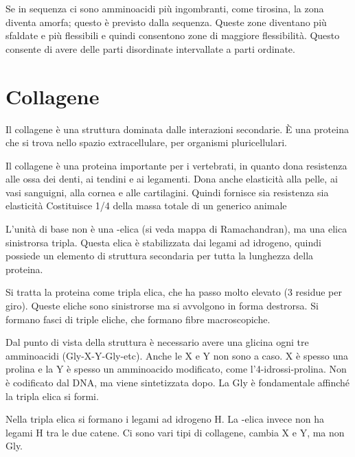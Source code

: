 
Se in sequenza ci sono amminoacidi più ingombranti, come tirosina, la
zona diventa amorfa; questo è previsto dalla sequenza. Queste zone diventano
più sfaldate e più flessibili e quindi consentono zone di maggiore
flessibilità. Questo consente di avere delle parti disordinate
intervallate a parti ordinate.

\clearpage

\section{Collagene}

Il collagene è una struttura dominata dalle interazioni secondarie. È una proteina che si
trova nello spazio extracellulare, per organismi pluricellulari.

Il collagene è una proteina importante per i vertebrati, in quanto dona resistenza alle ossa dei denti,
ai tendini e ai legamenti. Dona anche elasticità alla pelle, ai vasi sanguigni, alla cornea e
alle cartilagini. Quindi fornisce sia resistenza sia elasticità
Costituisce 1/4 della massa totale di un generico animale

L'unità di base non è una \alpha-elica (si veda mappa di Ramachandran), ma una elica sinistrorsa tripla.
Questa elica è stabilizzata dai legami ad idrogeno, quindi possiede un elemento di
struttura secondaria per tutta la lunghezza della proteina.

Si tratta la proteina come tripla elica, che ha passo molto elevato (3 residue
per giro). Queste eliche sono sinistrorse ma si avvolgono in forma destrorsa.
Si formano fasci di triple eliche, che formano fibre macroscopiche.

\begingroup{} \endgroup

Dal punto di vista della struttura è necessario avere una glicina ogni
tre amminoacidi (Gly-X-Y-Gly-etc). Anche le X e Y non sono a caso. X è
spesso una prolina e la Y è spesso un amminoacido modificato, come l'4-idrossi-prolina. Non è codificato dal DNA, ma viene sintetizzata
dopo.
La Gly è fondamentale affinché la tripla elica si formi.


Nella tripla elica si formano i legami ad idrogeno H. La \alpha-elica invece non ha
legami H tra le due catene.
Ci sono vari tipi di collagene, cambia X e Y, ma non Gly.

